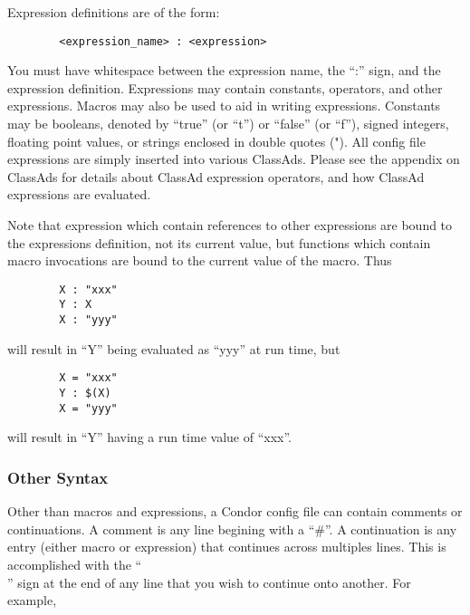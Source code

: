 Expression definitions are of the form:

\begin{verbatim}
        <expression_name> : <expression>
\end{verbatim}

\Note You must have whitespace between the expression name,
the ``:'' sign, and the expression definition.  Expressions may
contain constants, operators, and other expressions.  Macros may also
be used to aid in writing expressions.  Constants may be booleans,
denoted by ``true'' (or ``t'') or ``false'' (or ``f''), signed
integers, floating point values, or strings enclosed in double quotes
(").  All config file expressions are simply inserted into various
ClassAds.  Please see the appendix on ClassAds for details about
ClassAd expression operators, and how ClassAd expressions are
evaluated.

Note that expression which contain references to other expressions are
bound to the expressions definition, not its current value, but
functions which contain macro invocations are bound to the current
value of the macro.  Thus

\begin{verbatim}
        X : "xxx"
        Y : X
        X : "yyy"
\end{verbatim}

will result in ``Y'' being evaluated as ``yyy'' at run time, but

\begin{verbatim}
        X = "xxx"
        Y : $(X)
        X = "yyy" 
\end{verbatim}

will result in ``Y'' having a run time value of ``xxx''.

\subsubsection{Other Syntax}
\label{sec:Other-Syntax}

Other than macros and expressions, a Condor config file can contain
comments or continuations.  A comment is any line begining with a
``\#''.  A continuation is any entry (either macro or expression) that
continues across multiples lines.  This is accomplished with the
``\\'' sign at the end of any line that you wish to continue onto
another.  For example,

